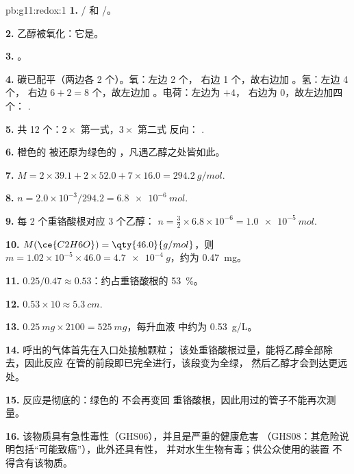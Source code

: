 \begin{solution}{pb:g11:redox:1}
\textbf{1.} / 和 /。

\textbf{2.} 乙醇被氧化：它是。

\textbf{3.} 。

\textbf{4.} 碳已配平（两边各 2 个）。氧：左边 2 个，
右边 1 个，故右边加 。氢：左边 4 个，
右边 $6 + 2 = 8$ 个，故左边加 。电荷：左边为 $+4$，
右边为 0，故左边加四个：
.

\textbf{5.} 共 12 个：$2\times$ 第一式，$3\times$ 第二式
反向：
.

\textbf{6.} 橙色的  被还原为绿色的
 ，凡遇乙醇之处皆如此。

\textbf{7.} $M = 2\times 39.1 + 2\times 52.0 + 7\times 16.0 =
\qty{294.2}{g/mol}$.

\textbf{8.} $n = 2.0\times 10^{-3}/294.2 = \qty{6.8e-6}{mol}$.

\textbf{9.} 每 2 个重铬酸根对应 3 个乙醇：
$n = \tfrac{3}{2}\times 6.8\times 10^{-6} = \qty{1.0e-5}{mol}$.

\textbf{10.} $M(\ce{C2H6O}) = \qty{46.0}{g/mol}$，则
$m = 1.02\times 10^{-5}\times 46.0 = \qty{4.7e-4}{g}$，约为
\qty{0.47}{mg}。

\textbf{11.} $0.25/0.47 \approx 0.53$：约占重铬酸根的
\qty{53}{\percent}。

\textbf{12.} $0.53 \times 10 \approx \qty{5.3}{cm}$.

\textbf{13.} $\qty{0.25}{mg} \times 2100 = \qty{525}{mg}$，每升血液
中约为 \qty{0.53}{g/L}。

\textbf{14.} 呼出的气体首先在入口处接触颗粒；
该处重铬酸根过量，能将乙醇全部除去，因此反应
在管的前段即已完全进行，该段变为全绿，
然后乙醇才会到达更远处。

\textbf{15.} 反应是彻底的：绿色的  不会再变回
重铬酸根，因此用过的管子不能再次测量。

\textbf{16.} 该物质具有急性毒性（GHS06），并且是严重的健康危害
（GHS08：其危险说明包括“可能致癌”），此外还具有性，
并对水生生物有毒；供公众使用的装置
不得含有该物质。


\end{solution}
